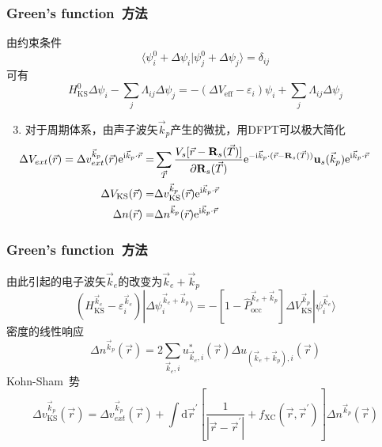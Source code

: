 \documentclass[cjk,slidestop,compress,mathserif,blue]{beamer}
\begin{document}
\frame
{
	\frametitle{\textrm{Green's function~}方法}
	由约束条件
	\begin{displaymath}
		\langle\psi_i^0+\Delta\psi_i|\psi_j^0+\Delta\psi_j\rangle=\delta_{ij}
	\end{displaymath}
	可有
	\begin{displaymath}
		H_{\mathrm{KS}}^0\Delta\psi_i-\sum_j\Lambda_{ij}\Delta\psi_j=-(\Delta V_{\mathrm{eff}}-\varepsilon_i)\psi_i+\sum_j\Lambda_{ij}\Delta\psi_j
	\end{displaymath}
	\begin{enumerate}
		\setcounter{enumi}{2}
	\item 对于周期体系，由声子波矢$\vec k_p$产生的微扰，用\textrm{DFPT}可以极大简化
		\begin{displaymath}
			\hspace*{-37pt}
			\begin{aligned}
					\Delta V_{ext}(\vec r)=\Delta v_{ext}^{\vec k_p}(\vec r)\mathrm{e}^{\mathrm{i}\vec k_p\cdot\vec r}=&\sum_{\vec T}\frac{V_s[\vec r-\mathbf{R}_s(\vec T)]}{\partial\mathbf{R}_s(\vec T)}\mathrm{e}^{-\mathrm{i}\vec k_p\cdot(\vec r-\mathbf{R}_s(\vec T))}\mathbf{u}_s(\vec k_p)\mathrm{e}^{\mathrm{i}\vec k_p\cdot\vec r}\\
				\Delta V_{\mathrm{KS}}(\vec r)=&\Delta v_{\mathrm{KS}}^{\vec k_p}(\vec r)\mathrm{e}^{\mathrm{i}\vec k_p\cdot\vec r}\\
				\Delta n(\vec r)=&\Delta n^{\vec k_p}(\vec r)\mathrm{e}^{\mathrm{i}\vec k_p\cdot\vec r}
			\end{aligned}
		\end{displaymath}
	\end{enumerate}
}

\frame
{
	\frametitle{\textrm{Green's function~}方法}
	由此引起的电子波矢$\vec k_e$的改变为$\vec k_e+\vec k_p$
	\begin{displaymath}
		(H_{\mathrm{KS}}^{\vec k_e}-\varepsilon_i^{\vec k_e})|\Delta\psi_i^{\vec k_e+\vec k_p}\rangle=-[1-\hat P_{\mathrm{occ}}^{\vec k_e+\vec k_p}]\Delta V_{\mathrm{KS}}^{\vec k_p}|\psi_i^{\vec k_e}\rangle
	\end{displaymath}
	密度的线性响应
	\begin{displaymath}
		\Delta n^{\vec k_p}(\vec r)=2\sum_{\vec k_e,i}u_{\vec k_e,i}^{\ast}(\vec r)\Delta u_{(\vec k_e+\vec k_{p}),i}(\vec r)
	\end{displaymath}
	\textrm{Kohn-Sham~}势
	\begin{displaymath}
		\Delta v_{\mathrm{KS}}^{\vec k_p}(\vec r)=\Delta v_{ext}^{\vec k_p}(\vec r)+\int\mathrm{d}\vec r^{\prime}\left[ \frac1{|\vec r-\vec r^{\prime}|}+f_{\mathrm{XC}}(\vec r,\vec r^{\prime}) \right]\Delta n^{\vec k_p}(\vec r)
	\end{displaymath}

}
\end{document}
